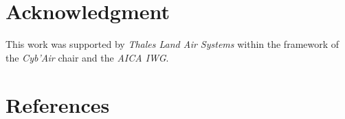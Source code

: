 \documentclass[conference]{IEEEtran}
\begin{document}

\section*{Acknowledgment}
    This work was supported by \emph{Thales Land Air Systems} within the framework of the \emph{Cyb'Air} chair and the \emph{AICA IWG}.

\section*{References}

\nocite{alDhuraibi2017elasticDocker}

% 



\end{document}
